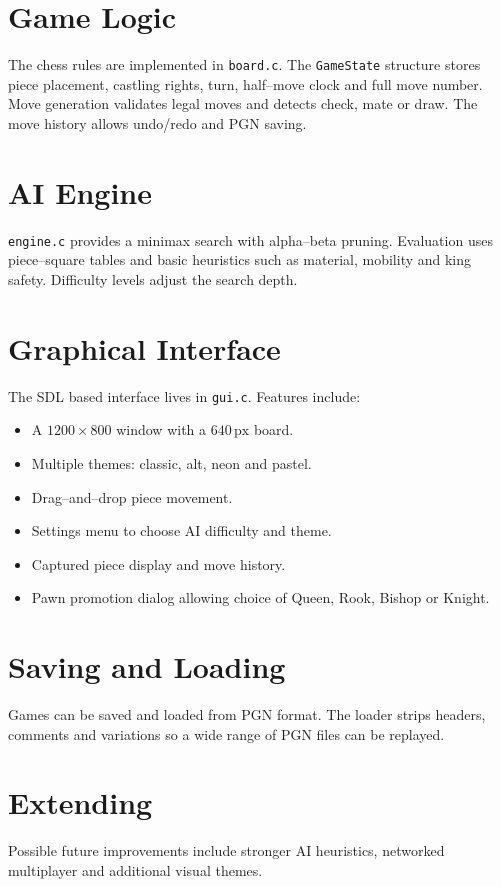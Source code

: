 \documentclass{article}
\begin{document}
\section{Game Logic}
The chess rules are implemented in \texttt{board.c}. The\newline
\texttt{GameState} structure stores piece placement, castling rights,
turn, half--move clock and full move number. Move generation validates
legal moves and detects check, mate or draw. The move history allows
undo/redo and PGN saving.

\section{AI Engine}
\texttt{engine.c} provides a minimax search with alpha--beta pruning.
Evaluation uses piece--square tables and basic heuristics such as
material, mobility and king safety. Difficulty levels adjust the search
depth.

\section{Graphical Interface}
The SDL based interface lives in \texttt{gui.c}. Features include:
\begin{itemize}
  \item A \(1200\times800\) window with a \(640\,\mathrm{px}\) board.
  \item Multiple themes: classic, alt, neon and pastel.
  \item Drag--and--drop piece movement.
  \item Settings menu to choose AI difficulty and theme.
  \item Captured piece display and move history.
  \item Pawn promotion dialog allowing choice of Queen, Rook, Bishop or Knight.
\end{itemize}

\section{Saving and Loading}
Games can be saved and loaded from PGN format. The loader strips headers,
comments and variations so a wide range of PGN files can be replayed.

\section{Extending}
Possible future improvements include stronger AI heuristics, networked
multiplayer and additional visual themes.
\end{document}
